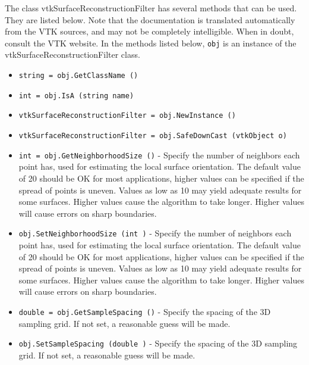 The class vtkSurfaceReconstructionFilter has several methods that can be used.
  They are listed below.
Note that the documentation is translated automatically from the VTK sources,
and may not be completely intelligible.  When in doubt, consult the VTK website.
In the methods listed below, \verb|obj| is an instance of the vtkSurfaceReconstructionFilter class.
\begin{itemize}
\item  \verb|string = obj.GetClassName ()|

\item  \verb|int = obj.IsA (string name)|

\item  \verb|vtkSurfaceReconstructionFilter = obj.NewInstance ()|

\item  \verb|vtkSurfaceReconstructionFilter = obj.SafeDownCast (vtkObject o)|

\item  \verb|int = obj.GetNeighborhoodSize ()| -  Specify the number of neighbors each point has, used for estimating the
 local surface orientation.  The default value of 20 should be OK for
 most applications, higher values can be specified if the spread of
 points is uneven. Values as low as 10 may yield adequate results for
 some surfaces. Higher values cause the algorithm to take longer. Higher
 values will cause errors on sharp boundaries.

\item  \verb|obj.SetNeighborhoodSize (int )| -  Specify the number of neighbors each point has, used for estimating the
 local surface orientation.  The default value of 20 should be OK for
 most applications, higher values can be specified if the spread of
 points is uneven. Values as low as 10 may yield adequate results for
 some surfaces. Higher values cause the algorithm to take longer. Higher
 values will cause errors on sharp boundaries.

\item  \verb|double = obj.GetSampleSpacing ()| -  Specify the spacing of the 3D sampling grid. If not set, a
 reasonable guess will be made.

\item  \verb|obj.SetSampleSpacing (double )| -  Specify the spacing of the 3D sampling grid. If not set, a
 reasonable guess will be made.

\end{itemize}
